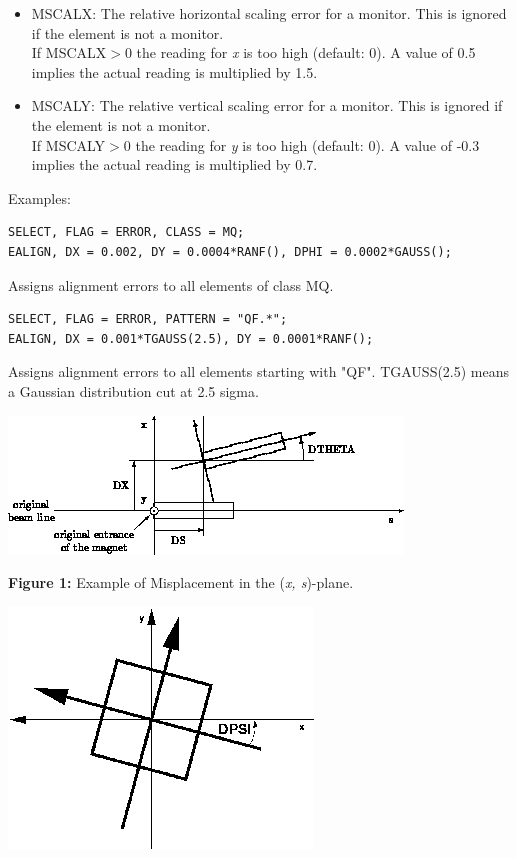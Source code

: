 \begin{itemize}
\item MSCALX: The relative horizontal scaling error for a monitor. This is ignored if the element is not a monitor. 
\\ If MSCALX$>$0 the reading for \textit{x} is too high (default: 0). A value of 0.5 implies the actual reading is multiplied by 1.5. 

\item MSCALY: The relative vertical scaling error for a monitor. This is ignored if the element is not a monitor.  
\\ If MSCALY$>$0 the reading for \textit{y} is too high (default: 0). A value of -0.3 implies the actual reading is multiplied by 0.7. 
\end{itemize}

Examples: 
\begin{verbatim}
SELECT, FLAG = ERROR, CLASS = MQ;                  
EALIGN, DX = 0.002, DY = 0.0004*RANF(), DPHI = 0.0002*GAUSS();
\end{verbatim}
Assigns alignment errors to all elements of class MQ.           



\begin{verbatim}
SELECT, FLAG = ERROR, PATTERN = "QF.*";            
EALIGN, DX = 0.001*TGAUSS(2.5), DY = 0.0001*RANF();
\end{verbatim} 
Assigns alignment errors to all elements starting with "QF". TGAUSS(2.5) means a Gaussian distribution cut at 2.5 sigma. 


\includegraphics{figures/xs_align.png}

\textbf{Figure 1:} Example of Misplacement in the (\textit{x, s})-plane. 

\includegraphics{error/dpsi.png}

